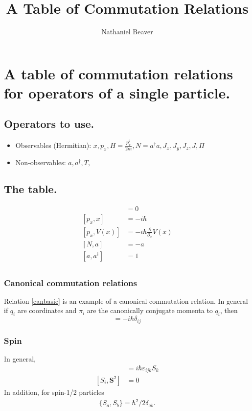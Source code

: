 \documentclass[12pt,letterpaper]{article}
\author{Nathaniel Beaver}
\title{A Table of Commutation Relations}
\begin{document}
\maketitle

\section{A table of commutation relations for operators of a single particle.}

\subsection{Operators to use.}

\begin{itemize}
\item Observables (Hermitian): $x, p_x, H=\frac{p_x^2}{2m}, N=a^\dagger a, J_x, J_y, J_z, J, \hyperref[def_Pi]{\Pi}$
\item Non-observables: $a, a^\dagger, T, $
\end{itemize}

\subsection{The table.}
\begin{align}
[B, B] &= 0\\
[p_x, x] &= - i\hbar \label{canbasic}\\
[p_x, V(x)] &= -i\hbar \frac{\partial}{\partial_x} V(x)\\
[N, a] &= - a\\
[a, a^\dag] &= 1\\
\end{align}
\subsubsection{Canonical commutation relations}
Relation \ref{canbasic} is an example of a canonical commutation relation. In general if $q_i$ are coordinates and $\pi_i$ are the canonically conjugate momenta to $q_i$, then
\begin{equation}
[\pi_i, q_j] = -i\hbar \delta_{ij}
\end{equation}

\subsubsection{Spin}
In general,
\begin{align}
  [S_i, S_j] &= i\hbar \varepsilon_{ijk} S_k\\
  [S_i, \mathbf{S}^2] &= 0
\end{align}
In addition, for spin-1/2 particles
\begin{align}
\{S_a, S_b\} = \hbar^2/2 \delta_{ab} . 
\end{align}
\end{document}
